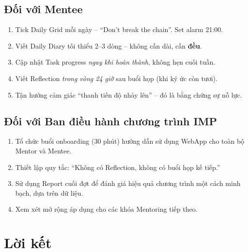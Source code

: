 \subsection{Đối với Mentee}
\begin{enumerate}
  \item Tick Daily Grid mỗi ngày -- ``Don't break the chain''. Set alarm 21:00.
  \item Viết Daily Diary tối thiểu 2--3 dòng -- không cần dài, cần \textbf{đều}.
  \item Cập nhật Task progress \textit{ngay khi hoàn thành}, không hẹn cuối tuần.
  \item Viết Reflection \textit{trong vòng 24 giờ} sau buổi họp (khi ký ức còn tươi).
  \item Tận hưởng cảm giác ``thanh tiến độ nhảy lên'' -- đó là bằng chứng sự nỗ lực.
\end{enumerate}

\subsection{Đối với Ban điều hành chương trình IMP}
\begin{enumerate}
  \item Tổ chức buổi onboarding (30 phút) hướng dẫn sử dụng WebApp cho toàn bộ Mentor và Mentee.
  \item Thiết lập quy tắc: ``Không có Reflection, không có buổi họp kế tiếp.''
  \item Sử dụng Report cuối đợt để đánh giá hiệu quả chương trình một cách minh bạch, dựa trên dữ liệu.
  \item Xem xét mở rộng áp dụng cho các khóa Mentoring tiếp theo.
\end{enumerate}

\section{Lời kết}

\begin{center}
\end{center}
